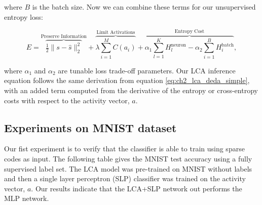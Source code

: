 \noindent where $B$ is the batch size. Now we can combine these terms for our unsupervised entropy loss:

\begin{equation}\label{eq:ch3_lcaf_unsupervised_energy}
         E =
        \overbrace{ \tfrac{1}{2} \| s - \hat{s} \|_{2}^{2} }^\text{Preserve Information} +
        \overbrace{ \lambda \sum\limits_{i=1}^{M}C(a_{i}) }^\text{Limit Activations} +
        \overbrace{ \alpha_{1} \sum\limits_{l=1}^{K} H^{\text{neuron}}_{l} - \alpha_{2} \sum\limits_{i=1}^{B}H^{\text{batch}}_{i}}^\text{Entropy Cost},
\end{equation}

\noindent where $\alpha_{1}$ and $\alpha_{2}$ are tunable loss trade-off parameters. Our LCA inference equation follows the same derivation from equation \eqref{eq:ch2_lca_deda_simple}, with an added term computed from the derivative of the entropy or cross-entropy costs with respect to the activity vector, $a$.


\subsection{Experiments on MNIST dataset}
Our fist experiment is to verify that the classifier is able to train using sparse codes as input. The following table gives the MNIST test accuracy using a fully supervised label set. The LCA model was pre-trained on MNIST without labels and then a single layer perceptron (SLP) classifier was trained on the activity vector, $a$. Our results indicate that the LCA+SLP network out performs the MLP network.

